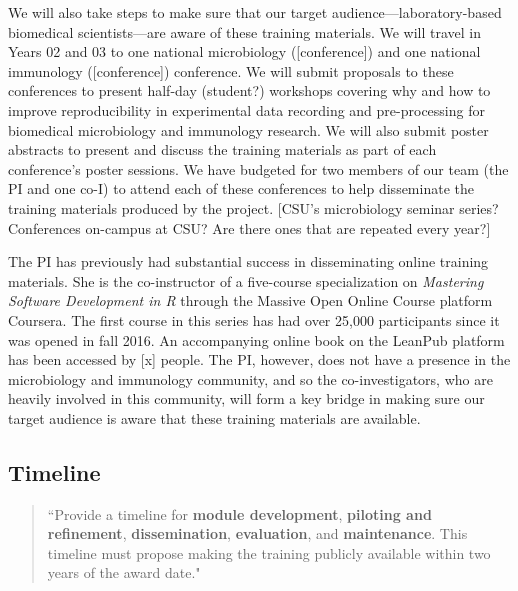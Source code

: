 \documentclass[pdftex,english,11pt,parskip=half]{scrartcl}
\begin{document}
We will also take steps to make sure that our target audience---laboratory-based biomedical scientists---are aware of these training materials. We will travel in Years 02 and 03 to one national microbiology ([conference]) and one national immunology ([conference]) conference. We will submit proposals to these conferences to present half-day (student?) workshops covering why and how to improve reproducibility in experimental data recording and pre-processing for biomedical microbiology and immunology research. We will also submit poster abstracts to present and discuss the training materials as part of each conference's poster sessions. We have budgeted for two members of our team (the PI and one co-I) to attend each of these conferences to help disseminate the training materials produced by the project. [CSU's microbiology seminar series? Conferences on-campus at CSU? Are there ones that are repeated every year?]

The PI has previously had substantial success in disseminating online training materials. She is the co-instructor of a five-course specialization on \textit{Mastering Software Development in R} through the Massive Open Online Course platform Coursera. The first course in this series has had over 25,000 participants since it was opened in fall 2016. An accompanying online book on the LeanPub platform has been accessed by [x] people. The PI, however, does not have a presence in the microbiology and immunology community, and so the co-investigators, who are heavily involved in this community, will form a key bridge in making sure our target audience is aware that these training materials are available.

\subsection{Timeline}

\begin{quotation}
``Provide a timeline for \textbf{module development}, \textbf{piloting and refinement}, \textbf{dissemination}, \textbf{evaluation}, and \textbf{maintenance}.  This timeline must propose making the training publicly available within two years of the award date."
\end{quotation}
\end{document}
